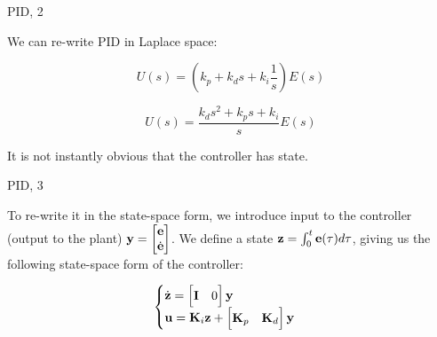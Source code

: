 \documentclass{beamer}
\begin{document}
\begin{frame}{PID, 2}
	\begin{flushleft}
		
		We can re-write PID in Laplace space:
		
		\begin{equation}
			U(s) = \left(k_p  + k_d s + k_i \frac{1}{s} \right )E(s)
		\end{equation}
		
		\begin{equation}
			U(s) =
			\frac{k_d s^2 + k_p s + k_i }{s}E(s)
		\end{equation}
		
		It is not instantly obvious that the controller has state.
		
	\end{flushleft}
\end{frame}




\begin{frame}{PID, 3}
	\begin{flushleft}
		
		To re-write it in the state-space form, we introduce input to the controller (output to the plant) $\mathbf{y} = \begin{bmatrix}
		\mathbf{e} \\ \dot{\mathbf{e}}
		\end{bmatrix}$. We define a state $\mathbf{z} = \int_{0}^{t} \mathbf{e}(\tau) d \tau$, giving us the following state-space form of the controller:
		
		\begin{equation}
			\begin{cases}
				\dot{ \mathbf{z} }  = 
				\begin{bmatrix}
					\mathbf{I} & 0
				\end{bmatrix}\mathbf{y}
				\\
				\mathbf{u} = \mathbf{K}_i \mathbf{z} + 
				\begin{bmatrix}
					 \mathbf{K}_p &  \mathbf{K}_d
				\end{bmatrix} \mathbf{y}
			\end{cases}
		\end{equation}
		
	\end{flushleft}
\end{frame}
\end{document}
